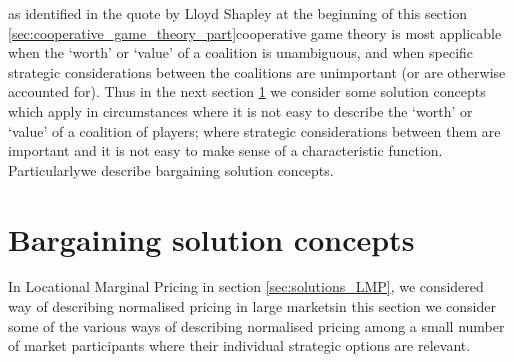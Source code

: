 
\DIFdelbegin {}\DIFdelend \DIFaddbegin {}\DIFaddend as identified in the quote by Lloyd Shapley at the beginning of this section \ref{sec:cooperative_game_theory_part}\DIFdelbegin \DIFdel{, }\DIFdelend \DIFaddbegin \DIFadd{) }\DIFaddend cooperative game theory is most applicable when the `worth' or `value' of a coalition is unambiguous, and when specific strategic considerations between the coalitions are unimportant (or are otherwise accounted for).
\DIFaddbegin {}\DIFaddend Thus in the next section \ref{sec:solutions_bargaining} we consider some solution concepts which apply in circumstances where it is not easy to describe the `worth' or `value' of a coalition of players; where strategic considerations between them are important and it is not easy to make sense of a characteristic function.
Particularly\DIFaddbegin \DIFadd{, }\DIFaddend we describe bargaining solution concepts.


\section{Bargaining solution concepts}\label{sec:solutions_bargaining}

In \DIFdelbegin {}\DIFdelend \DIFaddbegin {}\DIFaddend Locational Marginal Pricing \DIFdelbegin \DIFdel{(}\DIFdelend in section \ref{sec:solutions_LMP}\DIFdelbegin \DIFdel{)}\DIFdelend , we considered \DIFdelbegin {}\DIFdelend \DIFaddbegin {}\DIFaddend way of describing normalised pricing in large markets\DIFdelbegin {}\DIFdelend \DIFaddbegin {}\DIFaddend in this section we consider some of the various ways of describing normalised pricing among a small number of market participants where their individual strategic options are relevant.

